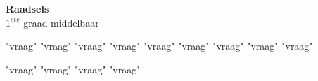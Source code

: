 \documentclass[12pt, a4paper]{article}
\begin{document}
	
	\begin{center}
		\Huge
		\textbf{Raadsels} \\
		\Large
		$1^{ste}$ graad middelbaar
	\end{center}
	
	{"vraag"}
	{"vraag"}
	{"vraag"}
	{"vraag"}	
	{"vraag"}
	{"vraag"}
	{"vraag"}
	{"vraag"}
	{"vraag"}

	{"vraag"}
	{"vraag"}
	{"vraag"}
	{"vraag"}
\end{document}
